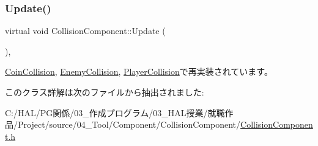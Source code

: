 \subsubsection{\texorpdfstring{Update()}{Update()}}
{\footnotesize\ttfamily virtual void Collision\+Component\+::\+Update (\begin{DoxyParamCaption}{ }\end{DoxyParamCaption})\hspace{0.3cm}{\ttfamily [inline]}, {\ttfamily [virtual]}}



\mbox{\hyperlink{class_coin_collision_a981fd9b1b8c688a757a456a56d80501b}{Coin\+Collision}}, \mbox{\hyperlink{class_enemy_collision_ab54133504d867c6d2070d2f3854a0aaf}{Enemy\+Collision}}, \mbox{\hyperlink{class_player_collision_a09f97f220903f5724a3af6b97af3a336}{Player\+Collision}}で再実装されています。



このクラス詳解は次のファイルから抽出されました\+:\begin{DoxyCompactItemize}
\item 
C\+:/\+H\+A\+L/\+P\+G関係/03\+\_\+作成プログラム/03\+\_\+\+H\+A\+L授業/就職作品/\+Project/source/04\+\_\+\+Tool/\+Component/\+Collision\+Component/\mbox{\hyperlink{_collision_component_8h}{Collision\+Component.\+h}}\end{DoxyCompactItemize}
